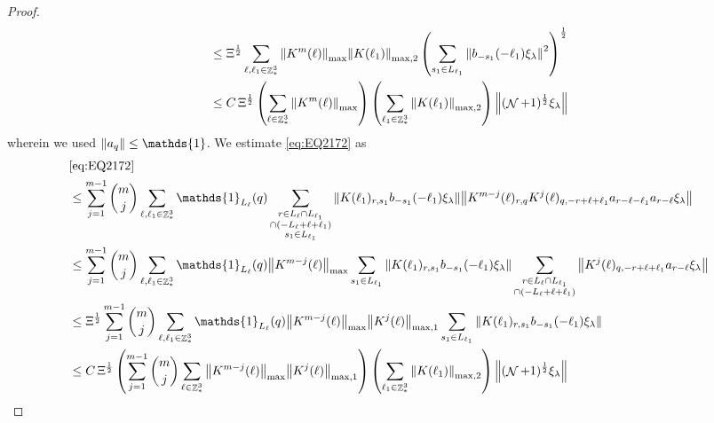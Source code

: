 \documentclass[12pt,a4paper]{article}
\numberwithin{equation}{section}
\newcommand{\1}{\mathbb{I}}
\DeclareMathOperator{\Z}{\mathbb{Z}}
\DeclareMathOperator{\NN}{\mathcal{N}}
\newcommand{\half}{\frac{1}{2}}
\theoremstyle{plain}
\theoremstyle{definition}
\theoremstyle{remark}
\theoremstyle{plain}
\theoremstyle{definition}
\theoremstyle{remark}
\begin{document}
\begin{proof}
\begin{align}
	&\leq \Xi^\half \sum\limits_{\ell, \ell_1\in \Z^3_*}  \norm{K^m(\ell)}_{\max} \norm{K(\ell_1)}_{\mathrm{max,2}} \left(\sum\limits_{s_1 \in L_{\ell_1}} \norm{ b_{-s_1}(-\ell_1) \xi_\lambda}^2\right)^\half\nonumber\\
	&\leq C\, \Xi^\half \left(\sum\limits_{\ell \in \Z^3_*} \norm{K^m(\ell)}_{\max}\right)\left( \sum\limits_{\ell_1\in \Z^3_*} \norm{ K(\ell_1)}_{\mathrm{max,2}} \right) \norm{(\NN+1)^\half\xi_\lambda}\label{eq:estEQ2171}
\end{align}
wherein we used $\norm{a_q} \leq \mathds{1}$.
We estimate \eqref{eq:EQ2172} as
\begin{align}
	&\eqref{eq:EQ2172}\nonumber\\
	&\leq\sum\limits_{j=1}^{m-1} {{m}\choose j} \sum\limits_{\ell, \ell_1\in \Z^3_*}\mathds{1}_{L_{\ell}}(q) \sum\limits_{\substack{r\in L_{\ell} \cap L_{\ell_1} \\ \cap (-L_{\ell}+\ell+\ell_1)\\s_1\in L_{\ell_1}}}  \norm{K(\ell_1)_{r,s_1} b_{-s_1}(-\ell_1) \xi_\lambda}\norm{ K^{m-j}(\ell)_{r,q} K^j(\ell)_{q,-r+\ell+\ell_1} a_{r-\ell-\ell_1} a_{r-\ell} \xi_\lambda }\nonumber\\
	&\leq\sum\limits_{j=1}^{m-1} {{m}\choose j} \sum\limits_{\ell, \ell_1\in \Z^3_*}\mathds{1}_{L_{\ell}}(q) \norm{K^{m-j}(\ell)}_{\max} \sum\limits_{s_1\in L_{\ell_1}} \norm{K(\ell_1)_{r,s_1} b_{-s_1}(-\ell_1) \xi_\lambda} \sum\limits_{\substack{r\in L_{\ell} \cap L_{\ell_1} \\ \cap (-L_{\ell}+\ell+\ell_1)}}  \norm{  K^j(\ell)_{q,-r+\ell+\ell_1} a_{r-\ell} \xi_\lambda }\nonumber\\
	&\leq \Xi^\half \sum\limits_{j=1}^{m-1} {{m}\choose j} \sum\limits_{\ell, \ell_1\in \Z^3_*}\mathds{1}_{L_{\ell}}(q)  \norm{K^{m-j}(\ell)}_{\max} \norm{K^{j}(\ell)}_{\mathrm{max,1}}  \sum\limits_{s_1\in L_{\ell_1}} \norm{K(\ell_1)_{r,s_1} b_{-s_1}(-\ell_1) \xi_\lambda} \nonumber\\
	&\leq  C\,\Xi^\half \left( \sum\limits_{j=1}^{m-1} {{m}\choose j} \sum\limits_{\ell \in \Z^3_*} \norm{K^{m-j}(\ell)}_{\max} \norm{ K^{j}(\ell)}_{\max,1}\right) \left( \sum\limits_{ \ell_1\in \Z^3_*}\norm{ K(\ell_1) }_{\mathrm{max,2}} \right) \norm{ (\NN+1)^\half \xi_\lambda }\label{eq:estEQ2172}
\end{align}


\end{proof}
\end{document}
